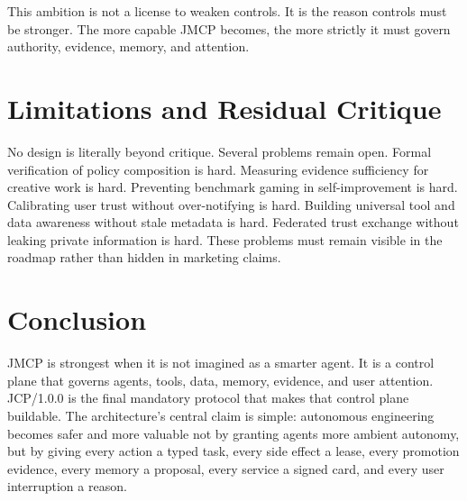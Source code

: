 \documentclass[12pt,journal,onecolumn,draftclsnofoot]{IEEEtran}
\begin{document}
This ambition is not a license to weaken controls. It is the reason controls must be stronger. The more capable JMCP becomes, the more strictly it must govern authority, evidence, memory, and attention.

\section{Limitations and Residual Critique}
No design is literally beyond critique. Several problems remain open. Formal verification of policy composition is hard. Measuring evidence sufficiency for creative work is hard. Preventing benchmark gaming in self-improvement is hard. Calibrating user trust without over-notifying is hard. Building universal tool and data awareness without stale metadata is hard. Federated trust exchange without leaking private information is hard. These problems must remain visible in the roadmap rather than hidden in marketing claims.

\section{Conclusion}
JMCP is strongest when it is not imagined as a smarter agent. It is a control plane that governs agents, tools, data, memory, evidence, and user attention. JCP/1.0.0 is the final mandatory protocol that makes that control plane buildable. The architecture's central claim is simple: autonomous engineering becomes safer and more valuable not by granting agents more ambient autonomy, but by giving every action a typed task, every side effect a lease, every promotion evidence, every memory a proposal, every service a signed card, and every user interruption a reason.

\appendices
\end{document}
